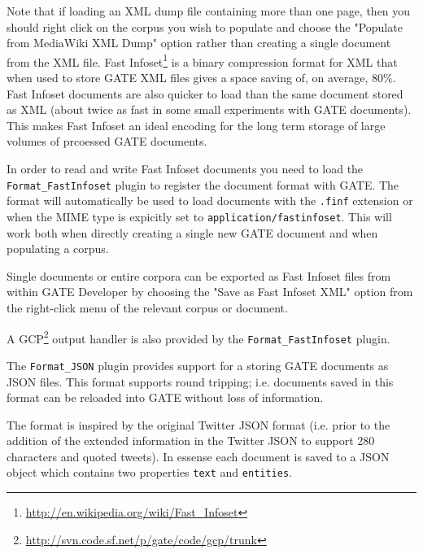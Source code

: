 Note that if loading an XML dump file containing more than one page, then you
should right click on the corpus you wish to populate and choose the "Populate
from MediaWiki XML Dump" option rather than creating a single document from the
XML file.
%
%
Fast Infoset\footnote{\url{http://en.wikipedia.org/wiki/Fast_Infoset}} is a
binary compression format for XML that when used to store GATE XML files
gives a space saving of, on average, 80\%. Fast Infoset documents are also
quicker to load than the same document stored as XML (about twice as fast
in some small experiments with GATE documents). This makes Fast Infoset an
ideal encoding for the long term storage of large volumes of prcoessed GATE
documents.

In order to read and write Fast Infoset documents you need to load the
\verb!Format_FastInfoset! plugin to register the document format with GATE.
The format will automatically be used to load documents with the \verb!.finf!
extension or when the MIME type is expicitly set to
\verb!application/fastinfoset!. This will work both when directly creating a
single new GATE document and when populating a corpus.

Single documents or entire corpora can be exported as Fast Infoset files from
within GATE Developer by choosing the "Save as Fast Infoset XML" option from
the right-click menu of the relevant corpus or document.

A GCP\footnote{\url{http://svn.code.sf.net/p/gate/code/gcp/trunk}} output
handler is also provided by the \verb!Format_FastInfoset! plugin.

%
%
The \verb!Format_JSON! plugin provides support for a storing GATE documents
as JSON files. This format supports round tripping; i.e. documents saved in
this format can be reloaded into GATE without loss of information.

The format is inspired by the original Twitter JSON format (i.e. prior to the
addition of the extended information in the Twitter JSON to support 280 
characters and quoted tweets). In essense each document is saved to a JSON
object which contains two properties \texttt{text} and \texttt{entities}.

